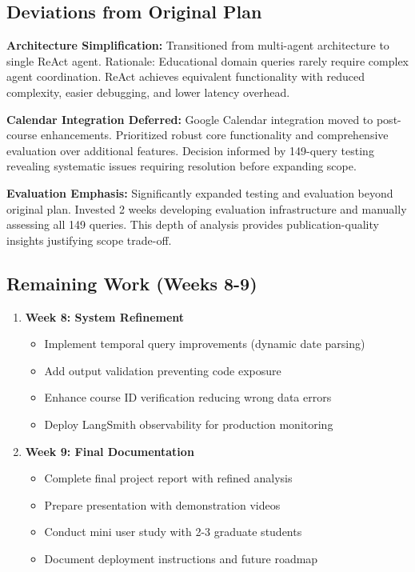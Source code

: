 \documentclass{article}
\begin{document}
\subsection{Deviations from Original Plan}

\textbf{Architecture Simplification:} Transitioned from multi-agent architecture to single ReAct agent. Rationale: Educational domain queries rarely require complex agent coordination. ReAct achieves equivalent functionality with reduced complexity, easier debugging, and lower latency overhead.

\textbf{Calendar Integration Deferred:} Google Calendar integration moved to post-course enhancements. Prioritized robust core functionality and comprehensive evaluation over additional features. Decision informed by 149-query testing revealing systematic issues requiring resolution before expanding scope.

\textbf{Evaluation Emphasis:} Significantly expanded testing and evaluation beyond original plan. Invested 2 weeks developing evaluation infrastructure and manually assessing all 149 queries. This depth of analysis provides publication-quality insights justifying scope trade-off.

\subsection{Remaining Work (Weeks 8-9)}

\begin{enumerate}
    \item \textbf{Week 8: System Refinement}
    \begin{itemize}
        \item Implement temporal query improvements (dynamic date parsing)
        \item Add output validation preventing code exposure
        \item Enhance course ID verification reducing wrong data errors
        \item Deploy LangSmith observability for production monitoring
    \end{itemize}
    
    \item \textbf{Week 9: Final Documentation}
    \begin{itemize}
        \item Complete final project report with refined analysis
        \item Prepare presentation with demonstration videos
        \item Conduct mini user study with 2-3 graduate students
        \item Document deployment instructions and future roadmap
    \end{itemize}
\end{enumerate}
\end{document}

